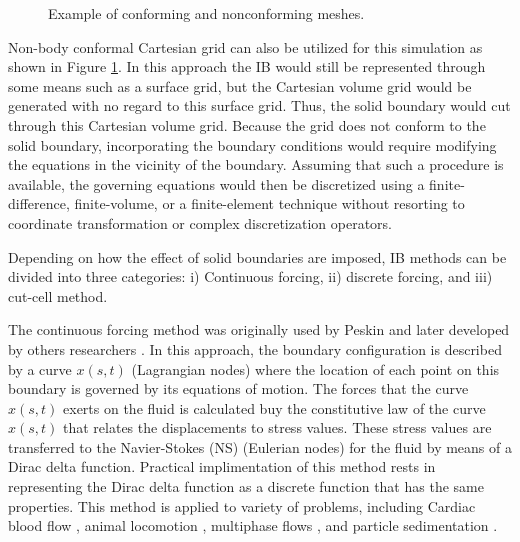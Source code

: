 \begin{figure}[H]
{	}
	\quad
	\caption{Example of conforming and nonconforming meshes.}
	\label{fig:C1_conformalVSnonconformal}
\end{figure}
%

Non-body conformal Cartesian grid can also be utilized for this simulation as shown in Figure \ref{fig:C1_conformalVSnonconformal}. In this approach the IB would still be represented through some means such as a surface grid, but the Cartesian volume grid would be generated with no regard to this surface grid. Thus, the solid boundary would cut through this Cartesian volume grid. Because the grid does not conform to the solid boundary, incorporating the boundary conditions would require modifying the equations in the vicinity of the boundary. Assuming that such a procedure is available, the governing equations would then be discretized using a finite-difference, finite-volume, or a finite-element technique without resorting to coordinate transformation or complex discretization operators.

Depending on how the effect of solid boundaries are imposed, IB methods can be divided into three categories: i) Continuous forcing, ii) discrete forcing, and iii) cut-cell method.

The continuous forcing method was originally used by Peskin \cite{peskin1977numerical} and later developed by others researchers \cite{saiki1996numerical, zhu2003interaction, beyer1992analysis}. In this approach, the boundary configuration is described by a curve $x(s,t)$ (Lagrangian nodes) where the location of each point on this boundary is governed by its equations of motion. The forces that the curve $x(s,t)$ exerts on the fluid is calculated buy the constitutive law of the curve $x(s,t)$ that relates the displacements to stress values. These stress values are transferred to the Navier-Stokes (NS) (Eulerian nodes) for the fluid by means of a Dirac delta function. Practical implimentation of this method rests in representing the Dirac delta function as a discrete function that has the same properties. This method is applied to variety of problems, including Cardiac blood flow \cite{peskin1989three}, animal locomotion \cite{fauci1988computational}, multiphase flows \cite{kempe2015imposing}, and particle sedimentation \cite{uhlmann2005immersed}.

